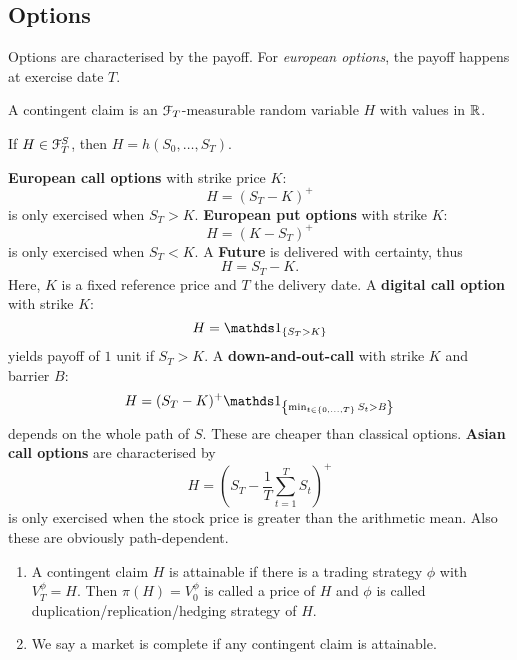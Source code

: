 \documentclass[12pt]{amsart}
\begin{document}
\subsection{Options}

Options are characterised by the payoff. For \emph{european options}, the payoff happens at exercise date \(T\).

\begin{definition}
    A contingent claim is an \(\mathcal{F}_T\)-measurable random variable \(H\) with values in \(\mathbb{R}\).
\end{definition}
\begin{remark}
    If \(H \in \mathcal{F}_T^S\), then \(H = h(S_0, \dots, S_T)\).
\end{remark}

\begin{example}
    \textbf{European call options} with strike price \(K\): \[
        H = (S_T-K)^+
    \]
    is only exercised when \(S_T > K\).
    \textbf{European put options} with strike \(K\): \[
        H = (K-S_T)^+
    \]
    is only exercised when \(S_T < K\). A \textbf{Future} is delivered with certainty, thus \[
        H = S_T-K.
    \]
    Here, \(K\) is a fixed reference price and \(T\) the delivery date.
    A \textbf{digital call option} with strike \(K\):
    \[
        H = \indic[S_T>K]
    \]
    yields payoff of \(1\) unit if \(S_T>K\). A \textbf{down-and-out-call} with strike \(K\) and barrier \(B\):\[
        H = (S_T-K)^+ \indic[\min_{t \in \set{0, \dots, T}} S_t > B]
    \]
    depends on the whole path of \(S\). These are cheaper than classical options. \textbf{Asian call options} are characterised by \[
        H = \left( S_T-\frac{1}{T}\sum_{t=1}^T S_t \right)^+
    \]
    is only exercised when the stock price is greater than the arithmetic mean. Also these are obviously path-dependent.
\end{example}

\begin{definition}
    \begin{enumerate}[label=(\alph*)]
        \item A contingent claim \(H\) is attainable if there is a trading strategy \(\phi\) with \(V_T^\phi = H\). Then \(\pi(H) = V_0^\phi\) is called a price of \(H\) and \(\phi\) is called duplication/replication/hedging strategy of \(H\).
        \item We say a market is complete if any contingent claim is attainable.
    \end{enumerate}
\end{definition}
\end{document}
